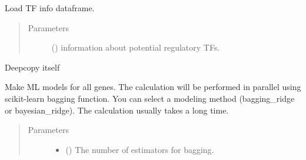 \documentclass[letterpaper,10pt,english]{sphinxmanual}
\begin{document}
\begin{fulllineitems}
\begin{fulllineitems}
\begin{quote}
\begin{description}
\end{description}\end{quote}

\end{fulllineitems}


\begin{fulllineitems}
\label{\detokenize{modules/celloracle:celloracle.Net.addTFinfo_matrix}}
Load TF info dataframe.
\begin{quote}\begin{description}
\item[{Parameters}] \leavevmode
{} () \textendash{} information about potential regulatory TFs.

\end{description}\end{quote}

\end{fulllineitems}


\begin{fulllineitems}
\label{\detokenize{modules/celloracle:celloracle.Net.copy}}
Deepcopy itself

\end{fulllineitems}


\begin{fulllineitems}
\label{\detokenize{modules/celloracle:celloracle.Net.fit_All_genes}}
Make ML models for all genes.
The calculation will be performed in parallel using scikit-learn bagging function.
You can select a modeling method (bagging\_ridge or bayesian\_ridge).  The calculation usually takes a long time.
\begin{quote}\begin{description}
\item[{Parameters}] \leavevmode\begin{itemize}
\item {} 
 () \textendash{} The number of estimators for bagging.


\end{itemize}
\end{description}
\end{quote}
\end{fulllineitems}
\end{fulllineitems}
\end{document}
